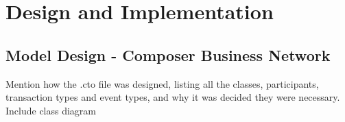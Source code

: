 \section{Design and Implementation}
\subsection{Model Design - Composer Business Network}
Mention how the .cto file was designed, listing all the classes, participants, transaction types and event types, and why it was decided they were necessary. Include class diagram
